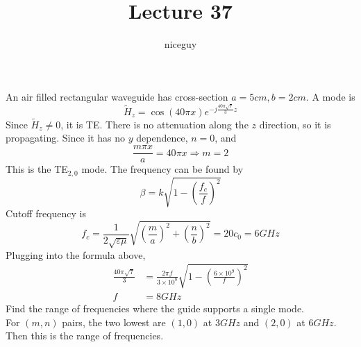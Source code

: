 \documentclass[12pt]{article}
\title{Lecture 37}
\author{niceguy}
\begin{document}
\maketitle

\begin{ex}
    An air filled rectangular waveguide has cross-section $a = 5\unit{cm}, b = 2\unit{cm}$. A mode is
    $$\tilde H_z = \cos(40\pi x)e^{-j\frac{40\pi\sqrt{7}}{3}z}$$
    Since $\tilde H_z \ne 0$, it is TE. There is no attenuation along the $z$ direction, so it is propagating. Since it has no $y$ dependence, $n = 0$, and
    $$\frac{m\pi x}{a} = 40\pi x \Rightarrow m = 2$$
    This is the TE$_{2,0}$ mode. The frequency can be found by
    $$\beta = k\sqrt{1 - \left(\frac{f_c}{f}\right)^2}$$
    Cutoff frequency is
    $$f_c = \frac{1}{2\sqrt{\varepsilon\mu}} \sqrt{\left(\frac{m}{a}\right)^2 + \left(\frac{n}{b}\right)^2} = 20c_0 = 6\unit{GHz}$$
    Plugging into the formula above,
    \begin{align*}
        \frac{40\pi\sqrt{7}}{3} &= \frac{2\pi f}{3\times10^8} \sqrt{1 - \left(\frac{6\times10^9}{f}\right)^2} \\
        f &= 8\unit{GHz}
    \end{align*}
    Find the range of frequencies where the guide supports a single mode. \\
    For $(m,n)$ pairs, the two lowest are $(1,0)$ at $3\unit{GHz}$ and $(2,0)$ at $6\unit{GHz}$. Then this is the range of frequencies.
\end{ex}
\end{document}
